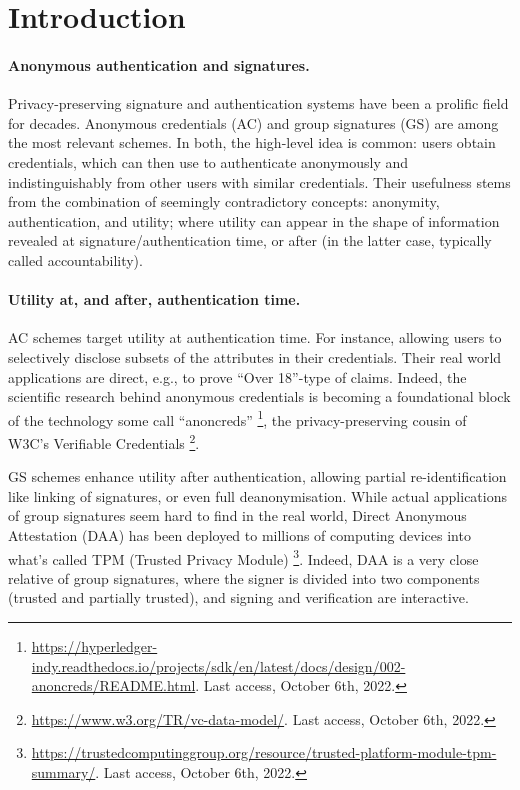 \section{Introduction}
\label{sec:introduction}


\paragraph{Anonymous authentication and signatures.} %
Privacy-preserving signature and authentication systems have been a prolific
field for decades. Anonymous credentials (AC) \cite{chau85} and group signatures
(GS) \cite{ch91} are among the most relevant schemes. In both, the
high-level idea is common: users obtain credentials, which can then use to
authenticate anonymously and indistinguishably from other users with similar
credentials. 
%
Their usefulness stems from the combination of seemingly contradictory concepts:
anonymity, authentication, and utility; where utility can appear in the shape of
information revealed at signature/authentication time, or after (in the latter
case, typically called accountability).

\paragraph{Utility at, and after, authentication time.} %
AC schemes target utility at authentication time. For instance, allowing
users to selectively disclose subsets of the attributes in their credentials.
Their real world applications are direct, e.g., to prove ``Over 18''-type of
claims. Indeed, the scientific research behind anonymous credentials is becoming
a foundational block of the technology some call ``anoncreds''%
\footnote{\url{https://hyperledger-indy.readthedocs.io/projects/sdk/en/latest/docs/design/002-anoncreds/README.html}. Last access, October 6th, 2022.},
the privacy-preserving cousin of W3C's Verifiable Credentials%
\footnote{\url{https://www.w3.org/TR/vc-data-model/}. Last access, October 6th,
  2022.}.

GS schemes enhance utility after authentication, allowing partial
re-identification like linking of signatures, or even full deanonymisation.
While actual applications of group signatures seem hard to find in the real
world, Direct Anonymous Attestation (DAA) \cite{bcc04,bl07,cdl16b} has been
deployed to millions of computing devices into what's called TPM (Trusted
Privacy Module)%
\footnote{\url{https://trustedcomputinggroup.org/resource/trusted-platform-module-tpm-summary/}. Last access, October 6th, 2022.}.
Indeed, DAA is a very close relative of group signatures, where the signer is
divided into two components (trusted and partially trusted), and signing
and verification are interactive.

